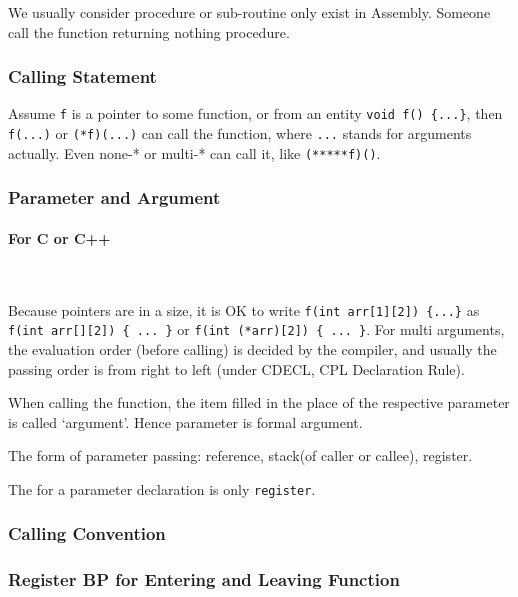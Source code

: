 
We usually consider procedure or sub-routine only exist in Assembly. %
Someone call the function returning nothing procedure. %

\subsubsection{Calling Statement}

Assume \verb`f` is a pointer to some function, or from an entity \verb`void f() {...}`, then \verb`f(...)` or \verb`(*f)(...)` can call the function, where \verb`...` stands for arguments actually. Even none-* or multi-* can call it, like \verb`(*****f)()`. %

\subsubsection{Parameter and Argument}

\paragraph{For C or C++}\

Because pointers are in a size, it is OK to write \verb`f(int arr[1][2]) {...}` as \verb`f(int arr[][2]) { ... }` or \verb`f(int (*arr)[2]) { ... }`.
For multi arguments, the evaluation order (before calling) is decided by the compiler, and usually the passing order is from right to left (under CDECL, CPL Declaration Rule).

When calling the function, the item filled in the place of the respective parameter is called `argument'. Hence parameter is {formal argument}.

The form of parameter passing: reference, stack(of caller or callee), register.

The  for a parameter declaration is only \verb`register`.

\subsubsection{Calling Convention}

\subsubsection{Register BP for Entering and Leaving Function}



